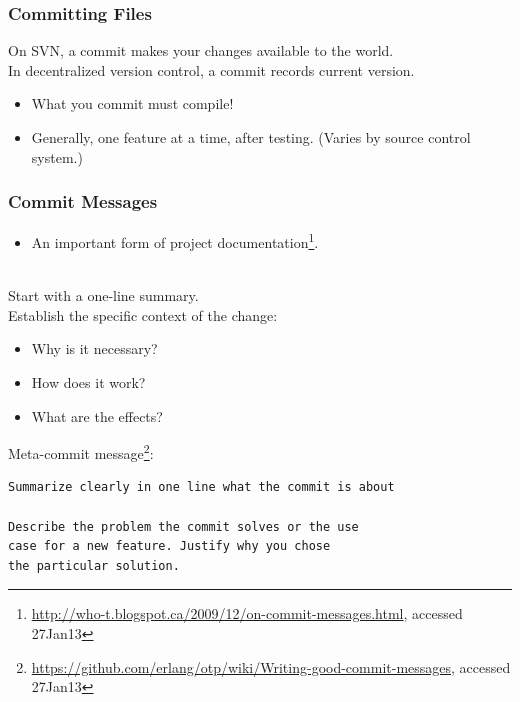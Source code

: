 \begin{frame}
\frametitle{Committing Files}
\begin{changemargin}{1cm}
\large

On SVN, a commit makes your changes available to the world.\\
In decentralized version control, a commit records current version.\\[1em]


\begin{itemize}
\item \alert{What you commit must compile!}
\item Generally, one feature at a time, after testing. (Varies by source control system.)
\end{itemize}

\end{changemargin}
\end{frame}

\begin{frame}[fragile]
\frametitle{Commit Messages}

\begin{changemargin}{1cm}
\begin{itemize}
\item An important form of project documentation\footnote{\tiny \url{http://who-t.blogspot.ca/2009/12/on-commit-messages.html}, accessed 27Jan13}.
\end{itemize}
~\\[1em]

Start with a one-line summary.\\[1em]

Establish the specific context of the change:
\begin{itemize}
\item Why is it necessary?
\item How does it work?
\item What are the effects?
\end{itemize}

Meta-commit message\footnote{\tiny \url{https://github.com/erlang/otp/wiki/Writing-good-commit-messages}, accessed 27Jan13}:
\end{changemargin}

{\small
\begin{verbatim}
Summarize clearly in one line what the commit is about

Describe the problem the commit solves or the use
case for a new feature. Justify why you chose
the particular solution.
\end{verbatim}
}

\end{frame}

